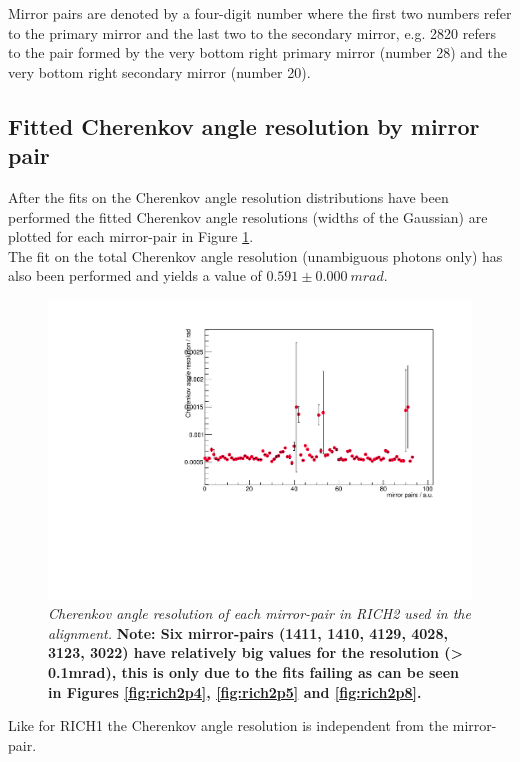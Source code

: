 Mirror pairs are denoted by a four-digit number where the first two numbers refer to the primary mirror and the last two to the secondary mirror, e.g. 2820 refers to the pair formed by the very bottom right primary mirror (number 28) and the very bottom right secondary mirror (number 20).\\

\subsection{Fitted Cherenkov angle resolution by mirror pair}
After the fits on the Cherenkov angle resolution distributions have been performed the fitted Cherenkov angle resolutions (widths of the Gaussian) are plotted for each mirror-pair in Figure \ref{fig:rich2res}.\\
The fit on the total Cherenkov angle resolution (unambiguous photons only) has also been performed and yields a value of $0.591 \pm 0.000 \ mrad$.
\begin{figure}[!h]
	\vspace*{-0.cm}
	\begin{center}
		\includegraphics[width=1.\textwidth]{resdis_rich2.pdf}
		\vspace*{-1.5cm}
	\end{center}
	\caption{\textit{Cherenkov angle resolution of each mirror-pair in RICH2 used in the alignment.} \textbf{Note: Six mirror-pairs (1411, 1410, 4129, 4028, 3123, 3022) have relatively big values for the resolution (> 0.1mrad), this is only due to the fits failing as can be seen in Figures \ref{fig:rich2p4}, \ref{fig:rich2p5} and \ref{fig:rich2p8}.}}
	\label{fig:rich2res}
\end{figure}
Like for RICH1 the Cherenkov angle resolution is independent from the mirror-pair.\\

